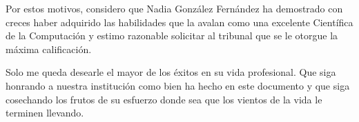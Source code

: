 \begin{opinion}
Por estos motivos, considero que Nadia González Fernández ha demostrado con creces haber adquirido las habilidades que la avalan como una excelente Científica de la Computación y estimo razonable solicitar al tribunal que se le otorgue la máxima calificación.

Solo me queda desearle el mayor de los éxitos en su vida profesional. Que siga honrando a nuestra institución como bien ha hecho en este documento y que siga cosechando los frutos de su esfuerzo donde sea que los vientos de la vida le terminen llevando.


\begingroup
\centering
{}
\par
\endgroup


\end{opinion}